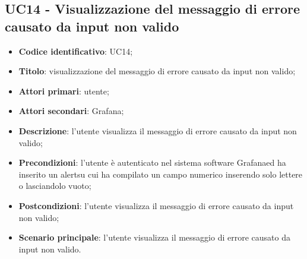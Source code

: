 \subsection{UC14 - Visualizzazione del messaggio di errore causato da input non valido}
\begin{itemize}
	\item \textbf{Codice identificativo}: UC14;
	\item \textbf{Titolo}: visualizzazione del messaggio di errore causato da input non valido;
	\item \textbf{Attori primari}: utente;
	\item \textbf{Attori secondari}: Grafana\glo;
	\item \textbf{Descrizione}: l'utente visualizza il messaggio di errore causato da input non valido;
	\item \textbf{Precondizioni}: l'utente è autenticato nel sistema software Grafana\glosp ed ha inserito un alert\glosp su cui ha compilato un campo numerico inserendo solo lettere o lasciandolo vuoto;
	\item \textbf{Postcondizioni}: l'utente visualizza il messaggio di errore causato da input non valido;
	\item \textbf{Scenario principale}: l'utente visualizza il messaggio di errore causato da input non valido.
\end{itemize}